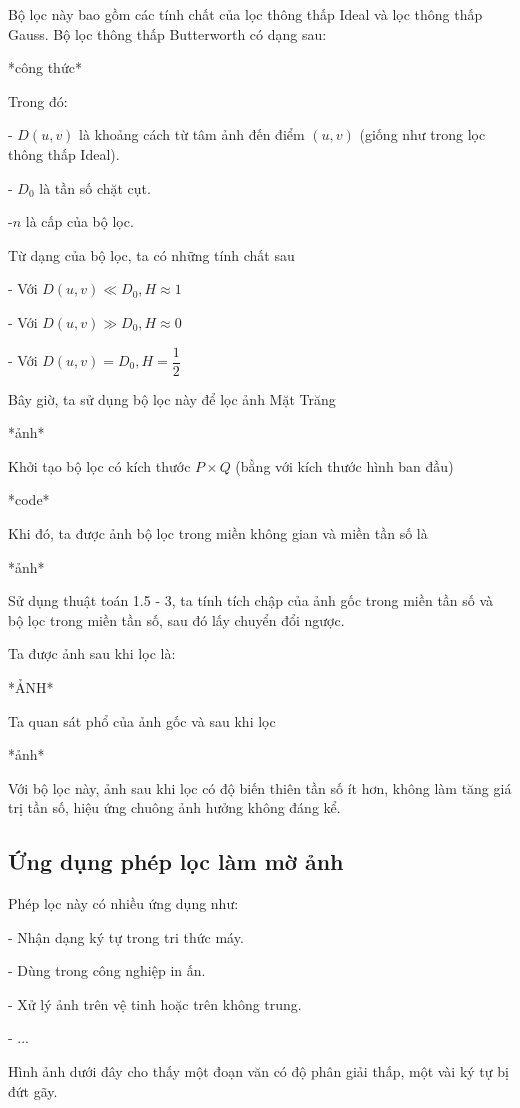 \documentclass[12pt,a4paper]{report}
\numberwithin{equation}{section}
\theoremstyle{definition} %
\begin{document}
Bộ lọc này bao gồm các tính chất của lọc thông thấp Ideal và lọc thông thấp Gauss. Bộ lọc thông thấp Butterworth có dạng sau:

*công thức*


Trong đó:

- $D(u,v)$ là khoảng cách từ tâm ảnh đến điểm $(u,v)$ (giống như trong lọc thông thấp Ideal).

- $D_0$ là tần số chặt cụt.

-$n$ là cấp của bộ lọc.

Từ dạng của bộ lọc, ta có những tính chất sau

- Với $D(u,v) \ll D_0, H\approx 1$

- Với $D(u,v) \gg D_0, H\approx 0$

- Với $D(u,v) = D_0, H= \dfrac{1}{2}$

Bây giờ, ta sử dụng bộ lọc này để lọc ảnh Mặt Trăng

*ảnh*

Khởi tạo bộ lọc có kích thước $P \times Q$ (bằng với kích thước hình ban đầu)

*code*

Khi đó, ta được ảnh bộ lọc trong miền không gian và miền tần số là 

*ảnh*

Sử dụng thuật toán 1.5 - 3, ta tính tích chập của ảnh gốc trong miền tần số và bộ lọc trong miền tần số, sau đó lấy chuyển đổi ngược.

Ta được ảnh sau khi lọc là:

*ẢNH*

Ta quan sát phổ của ảnh gốc và sau khi lọc 

*ảnh*

Với bộ lọc này, ảnh sau khi lọc có độ biến thiên tần số ít hơn, không làm tăng giá trị tần số, hiệu ứng chuông ảnh hưởng không đáng kể. 



\subsection{Ứng dụng phép lọc làm mờ ảnh}

Phép lọc này có nhiều ứng dụng như:

- Nhận dạng ký tự trong tri thức máy.

- Dùng trong công nghiệp in ấn.

- Xử lý ảnh trên vệ tinh hoặc trên không trung.

- ...

Hình ảnh dưới đây cho thấy một đoạn văn có độ phân giải thấp, một vài ký tự bị đứt gãy. 
\end{document}
